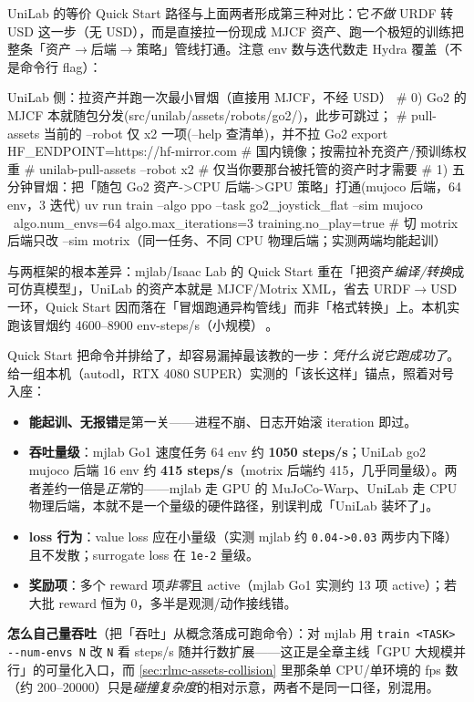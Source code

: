 UniLab 的等价 Quick Start 路径与上面两者形成第三种对比：它\emph{不做} URDF 转 USD 这一步（无 USD），而是直接拉一份现成 MJCF 资产、跑一个极短的训练把整条「资产$\to$后端$\to$策略」管线打通。注意 env 数与迭代数走 Hydra 覆盖（不是命令行 flag）：

\begin{codebox}[bash]{UniLab 侧：拉资产并跑一次最小冒烟（直接用 MJCF，不经 USD）}
# 0) Go2 的 MJCF 本就随包分发(src/unilab/assets/robots/go2/)，此步可跳过；
#    pull-assets 当前的 --robot 仅 x2 一项(--help 查清单)，并不拉 Go2
export HF_ENDPOINT=https://hf-mirror.com   # 国内镜像；按需拉补充资产/预训练权重
# unilab-pull-assets --robot x2            # 仅当你要那台被托管的资产时才需要
# 1) 五分钟冒烟：把「随包 Go2 资产->CPU 后端->GPU 策略」打通(mujoco 后端，64 env，3 迭代)
uv run train --algo ppo --task go2_joystick_flat --sim mujoco \
    algo.num_envs=64 algo.max_iterations=3 training.no_play=true
# 切 motrix 后端只改 --sim motrix（同一任务、不同 CPU 物理后端；实测两端均能起训）
\end{codebox}

与两框架的根本差异：mjlab/Isaac Lab 的 Quick Start 重在「把资产\emph{编译/转换}成可仿真模型」，UniLab 的资产本就是 MJCF/Motrix XML，省去 URDF$\to$USD 一环，Quick Start 因而落在「冒烟跑通异构管线」而非「格式转换」上。本机实跑该冒烟约 4600--8900 env-steps/s（小规模）\,\cite{unilab2026}。

\begin{note}[「跑起来后怎么判断成功」——一份跨框架的冒烟判据（含本机实测锚点）]\label{note:rlmc-assets-smoke}
Quick Start 把命令并排给了，却容易漏掉最该教的一步：\emph{凭什么说它跑成功了}。给一组本机（autodl，RTX 4080 SUPER）实测的「该长这样」锚点，照着对号入座：
\begin{itemize}
  \item \textbf{能起训、无报错}是第一关——进程不崩、日志开始滚 iteration 即过。
  \item \textbf{吞吐量级}：mjlab Go1 速度任务 64 env 约 \textbf{1050 steps/s}；UniLab go2 mujoco 后端 16 env 约 \textbf{415 steps/s}（motrix 后端约 415，几乎同量级）。两者差约一倍是\emph{正常}的——mjlab 走 GPU 的 MuJoCo-Warp、UniLab 走 CPU 物理后端，本就不是一个量级的硬件路径，别误判成「UniLab 装坏了」。
  \item \textbf{loss 行为}：value loss 应在小量级（实测 mjlab 约 \verb|0.04->0.03| 两步内下降）且不发散；surrogate loss 在 \verb|1e-2| 量级。
  \item \textbf{奖励项}：多个 reward 项\emph{非零}且 active（mjlab Go1 实测约 13 项 active）；若大批 reward 恒为 0，多半是观测/动作接线错。
\end{itemize}
\textbf{怎么自己量吞吐}（把「吞吐」从概念落成可跑命令）：对 mjlab 用 \verb|train <TASK> --num-envs N| 改 \verb|N| 看 steps/s 随并行数扩展——这正是全章主线「GPU 大规模并行」的可量化入口，而 \cref{sec:rlmc-assets-collision} 里那条单 CPU/单环境的 fps 数（约 200--20000）只是\emph{碰撞复杂度}的相对示意，两者不是同一口径，别混用。
\end{note}

